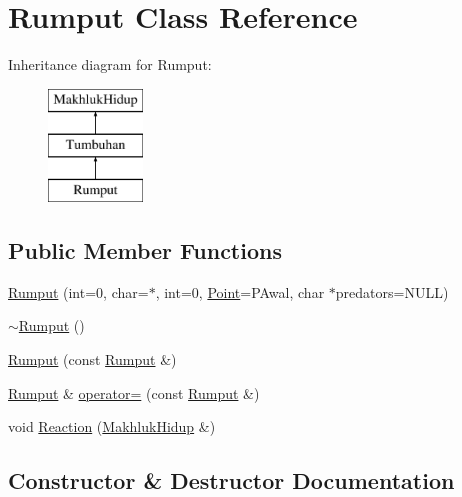 \hypertarget{class_rumput}{}\section{Rumput Class Reference}
\label{class_rumput}
Inheritance diagram for Rumput\+:\begin{figure}[H]
\begin{center}
\leavevmode
\includegraphics[height=3.000000cm]{class_rumput}
\end{center}
\end{figure}
\subsection*{Public Member Functions}
\begin{DoxyCompactItemize}
\item 
\hyperlink{class_rumput_ae824be2e294a51f888f7592de10c9e37}{Rumput} (int=0, char=\textquotesingle{}$\ast$\textquotesingle{}, int=0, \hyperlink{class_point}{Point}=P\+Awal, char $\ast$predators=N\+U\+LL)
\item 
\hyperlink{class_rumput_af6734c13f61edd0538c9e0c92863b753}{$\sim$\+Rumput} ()
\item 
\hyperlink{class_rumput_ada42c7396802450adab3b70cc901820f}{Rumput} (const \hyperlink{class_rumput}{Rumput} \&)
\item 
\hyperlink{class_rumput}{Rumput} \& \hyperlink{class_rumput_a5e6f6663f305dd767b4430639b37bf7d}{operator=} (const \hyperlink{class_rumput}{Rumput} \&)
\item 
void \hyperlink{class_rumput_ab09bf354ca4ceb08cb023ac068a42d90}{Reaction} (\hyperlink{class_makhluk_hidup}{Makhluk\+Hidup} \&)
\end{DoxyCompactItemize}


\subsection{Constructor \& Destructor Documentation}
